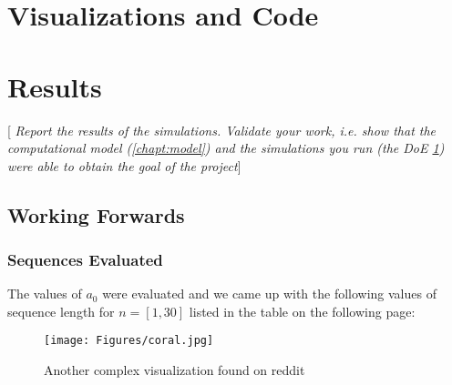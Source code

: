 \documentclass[10pt,english, openany]{book}
\begin{document}
\chapter{Visualizations and Code}\label{chapt:doe}




\lstlistoflistings

\chapter{Results}\label{chapt:results}
[\textit{ Report the results of the simulations. Validate your work, i.e. show that the computational model (\ref{chapt:model}) and the simulations you run (the DoE \ref{chapt:doe}) were able to obtain the goal of the project}]
\section{Working Forwards}
\subsection{Sequences Evaluated}
The values of $a_0$ were evaluated and we came up with the following values of sequence length for $n = [1,30]$ listed in the table on the following page:\\

\begin{figure}[h]
\texttt{[image: Figures/coral.jpg]}
\caption{Another complex visualization found on reddit}
\end{figure}
\end{document}
